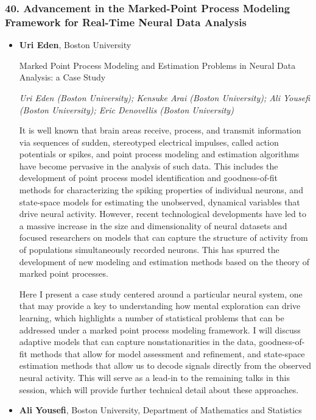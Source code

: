 \subsubsection*{40. Advancement in the Marked-Point Process Modeling Framework for Real-Time Neural Data Analysis}

\begin{itemize}
\item \textbf{Uri Eden}, Boston University

Marked Point Process Modeling and Estimation Problems in Neural Data Analysis: a Case Study

\emph{\footnotesize Uri Eden (Boston University); Kensuke Arai (Boston University); Ali Yousefi (Boston University); Eric Denovellis (Boston University)}

It is well known that brain areas receive, process, and transmit information via sequences of sudden, stereotyped electrical impulses, called action potentials or spikes, and point process modeling and estimation algorithms have become pervasive in the analysis of such data. This includes the development of point process model identification and goodness-of-fit methods for characterizing the spiking properties of individual neurons, and state-space models for estimating the unobserved, dynamical variables that drive neural activity. However, recent technological developments have led to a massive increase in the size and dimensionality of neural datasets and focused researchers on models that can capture the structure of activity from of populations simultaneously recorded neurons. This has spurred the development of new modeling and estimation methods based on the theory of marked point processes. 

Here I present a case study centered around a particular neural system, one that may provide a key to understanding how mental exploration can drive learning, which highlights a number of statistical problems that can be addressed under a marked point process modeling framework. I will discuss adaptive models that can capture nonstationarities in the data, goodness-of-fit methods that allow for model assessment and refinement, and state-space estimation methods that allow us to decode signals directly from the observed neural activity. This will serve as a lead-in to the remaining talks in this session, which will provide further technical detail about these approaches.

\item \textbf{Ali Yousefi}, Boston University, Department of Mathematics and Statistics


\end{itemize}
